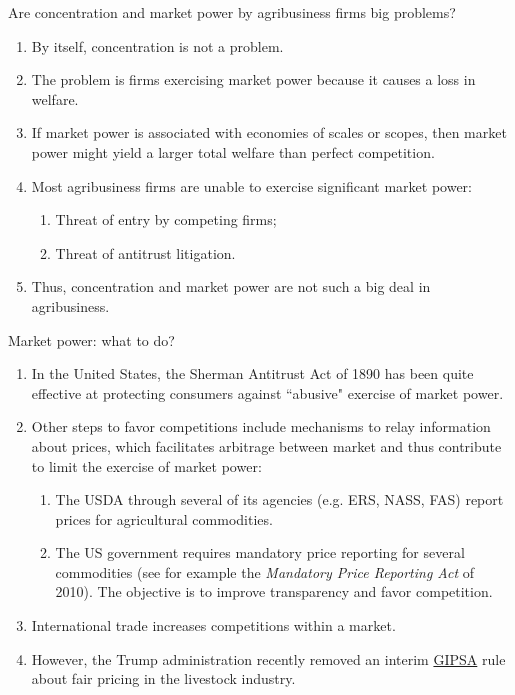 \documentclass[table,xcolor=pdftex,dvipsnames]{beamer}\usepackage[]{graphicx}\usepackage[]{color}
\begin{document}

\begin{frame}{Are concentration and market power by agribusiness firms big problems?}
\begin{enumerate}[label=\textbullet]
  \item By itself, concentration is not a problem.
  \item The problem is firms exercising market power because it causes a loss in welfare.
  \item If market power is associated with economies of scales or scopes, then market power might yield a larger total welfare than perfect competition.
  \item Most agribusiness firms are unable to exercise significant market power:
      \begin{enumerate}[label=-]
          \item Threat of entry by competing firms;
          \item Threat of antitrust litigation.
      \end{enumerate}
  \item Thus, concentration and market power are not such a big deal in agribusiness.
\end{enumerate}
\end{frame}



\begin{frame}[allowframebreaks]{Market power: what to do?}
\begin{enumerate}[label=\textbullet]
  \item  In the United States, the Sherman Antitrust Act of 1890 has been quite effective at protecting consumers against ``abusive" exercise of market power.
  \item Other steps to favor competitions include mechanisms to relay information about prices, which facilitates arbitrage between market and thus contribute to limit the exercise of market power:
    \begin{enumerate}[label=-]
        \item The USDA through several of its agencies (e.g. ERS, NASS, FAS) report prices for agricultural commodities.
        \item The US government requires mandatory price reporting for several commodities (see for example the \emph{Mandatory Price Reporting Act} of 2010). The objective is to improve transparency and favor competition.
  \end{enumerate}
  \item International trade increases competitions within a market.
  \item However, the Trump administration recently removed an interim \href{http://www.beefmagazine.com/ranching/usda-dumps-controversial-gipsa-rule}{GIPSA} rule about fair pricing in the livestock industry. 
\end{enumerate}
\end{frame}



\end{document}
